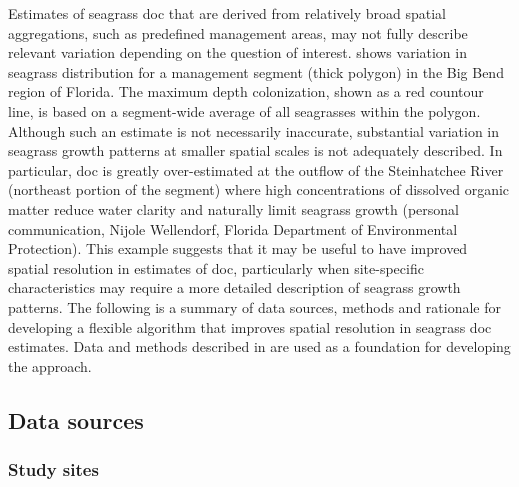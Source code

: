 \documentclass[letterpaper,12pt,oneside]{article}\usepackage[]{graphicx}\usepackage[]{color}
\begin{document}
Estimates of seagrass \ac{doc} that are derived from relatively broad spatial aggregations, such as predefined management areas, may not fully describe relevant variation depending on the question of interest.  shows variation in seagrass distribution for a management segment (thick polygon) in the Big Bend region of Florida.  The maximum depth colonization, shown as a red countour line, is based on a segment-wide average of all seagrasses within the polygon.  Although such an estimate is not necessarily inaccurate, substantial variation in seagrass growth patterns at smaller spatial scales is not adequately described. In particular, \ac{doc} is greatly over-estimated at the outflow of the Steinhatchee River (northeast portion of the segment) where high concentrations of dissolved organic matter reduce water clarity and naturally limit seagrass growth (personal communication, Nijole Wellendorf, Florida Department of Environmental Protection).  This example suggests that it may be useful to have improved spatial resolution in estimates of \ac{doc}, particularly when site-specific characteristics may require a more detailed description of seagrass growth patterns.  The following is a summary of data sources, methods and rationale for developing a flexible algorithm that improves spatial resolution in seagrass \ac{doc} estimates.  Data and methods described in  are used as a foundation for developing the approach.

\subsection{Data sources}

\subsubsection{Study sites}
\end{document}
